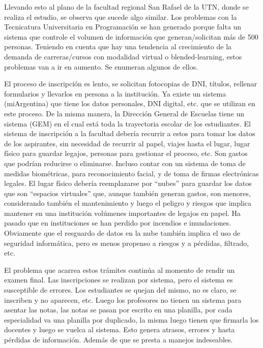 \documentclass[a4paper]{article}
\begin{document}
Llevando esto al plano de la facultad regional San Rafael de la UTN, donde se realiza el estudio, se observa que sucede algo similar. Los problemas con la Tecnicatura Universitaria en Programación se han generado porque falta un sistema que controle el volumen de información que generan/solicitan más de 500 personas. Teniendo en cuenta que hay una tendencia al crecimiento de la demanda de carreras/cursos con modalidad virtual o blended-learning, estos problemas van a ir en aumento. Se enumeran algunos de ellos.

El proceso de inscripción es lento, se solicitan fotocopias de DNI, títulos, rellenar formularios y llevarlos en persona a la institución. Ya existe un sistema (miArgentina) que tiene los datos personales, DNI digital, etc. que se utilizan en este proceso. De la misma manera, la Dirección General de Escuelas tiene un sistema (GEM) en el cual está toda la trayectoria escolar de los estudiantes.  El sistema de inscripción a la facultad debería recurrir a estos para tomar los datos de los aspirantes, sin necesidad de recurrir al papel, viajes hasta el lugar, lugar físico para guardar legajos, personas para gestionar el proceso, etc. Son gastos que podrían reducirse o eliminarse. Incluso contar con un sistema de toma de medidas biométricas, para reconocimiento facial, y de toma de firmas electrónicas legales. El lugar físico debería reemplazarse por “nubes” para guardar los datos que son “espacios virtuales” que, aunque también generan gastos, son menores, considerando también el mantenimiento y luego el peligro y riesgos que implica mantener en una institución volúmenes importantes de legajos en papel. Ha pasado que en instituciones se han perdido por incendios e inundaciones. Obviamente que el resguardo de datos en la nube también implica el uso de seguridad informática, pero es menos propenso a riesgos y a pérdidas, filtrado, etc. 

El problema que acarrea estos trámites continúa al momento de rendir un examen final. Las inscripciones se realizan por sistema, pero el sistema es susceptible de errores. Los estudiantes se quejan del mismo, no es claro, se inscriben y no aparecen, etc. Luego los profesores no tienen un sistema para asentar las notas, las notas se pasan por escrito en una planilla, por cada especialidad va una planilla por duplicado, la misma luego tienen que firmarla los docentes y luego se vuelca al sistema. Esto genera atrasos, errores y hasta pérdidas de información. Además de que se presta a manejos indeseables.  
\end{document}
